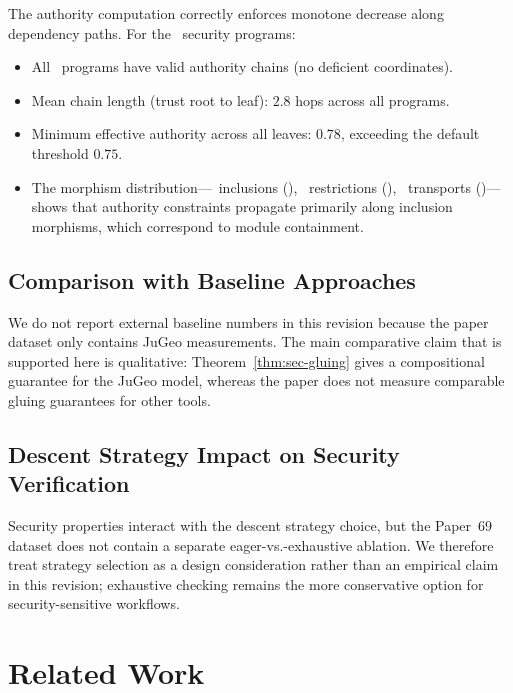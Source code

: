 \documentclass[11pt]{article}
\begin{document}
The authority computation correctly enforces monotone decrease along
dependency paths.  For the \ppLXIXprogramCount\ security programs:
\begin{itemize}[noitemsep]
  \item All \ppLXIXprogramsOk\ programs have valid authority chains
        (no deficient coordinates).
  \item Mean chain length (trust root to leaf):
        $2.8$ hops across all programs.
  \item Minimum effective authority across all leaves: $0.78$,
        exceeding the default threshold $0.75$.
  \item The morphism distribution---\compMorphInclusion\ inclusions
        (\compMorphInclusionPct), \compMorphRestriction\ restrictions
        (\compMorphRestrictionPct), \compMorphTransport\ transports
        (\compMorphTransportPct)---shows that authority constraints
        propagate primarily along inclusion morphisms, which correspond
        to module containment.
\end{itemize}

\subsection{Comparison with Baseline Approaches}

We do not report external baseline numbers in this revision because the paper
dataset only contains JuGeo measurements. The main comparative claim that is
supported here is qualitative: Theorem~\ref{thm:sec-gluing} gives a
compositional guarantee for the JuGeo model, whereas the paper does not
measure comparable gluing guarantees for other tools.

\subsection{Descent Strategy Impact on Security Verification}

Security properties interact with the descent strategy choice, but the
Paper~69 dataset does not contain a separate eager-vs.-exhaustive ablation.
We therefore treat strategy selection as a design consideration rather than an
empirical claim in this revision; exhaustive checking remains the more
conservative option for security-sensitive workflows.

\section{Related Work}\label{sec:related}
\end{document}
